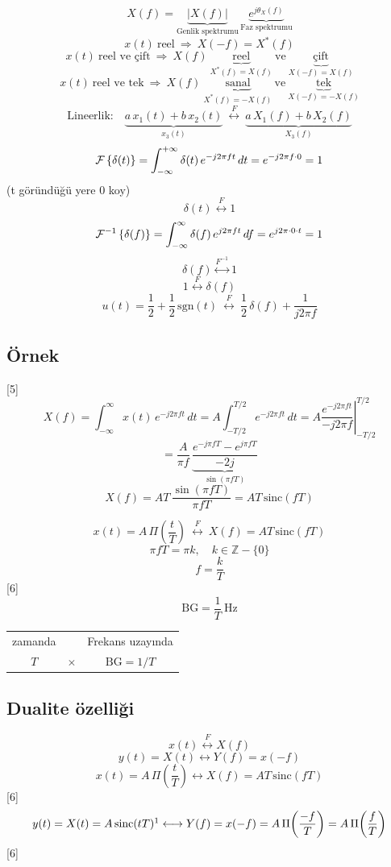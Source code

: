 \documentclass[11pt,a4paper]{article}
\begin{document}
\[ X(f)=\underbrace{|X(f)|}_{\text{Genlik spektrumu}}\,\underbrace{e^{j\theta_X(f)}}_{\text{Faz spektrumu}} \]
\[ x(t)\ \text{reel}\ \Rightarrow\ X(-f)=X^{*}(f) \]
\[ x(t)\ \text{reel ve çift}\ \Rightarrow\ X(f)\ \underbrace{\text{reel}}_{X^{*}(f)=X(f)}\ \text{ve}\ \underbrace{\text{çift}}_{X(-f)=X(f)} \]
\[ x(t)\ \text{reel ve tek}\ \Rightarrow\ X(f)\ \underbrace{\text{sanal}}_{X^{*}(f)=-X(f)}\ \text{ve}\ \underbrace{\text{tek}}_{X(-f)=-X(f)} \]
\[ \text{Lineerlik:}\quad \underbrace{a\,x_1(t)+b\,x_2(t)}_{x_3(t)}\ \overset{F}{\longleftrightarrow}\ \underbrace{a\,X_1(f)+b\,X_2(f)}_{X_3(f)} \]
\[ \mathcal{F}\left\{\delta(t)\right\}=\int_{-\infty}^{+\infty}\delta(t)\,e^{-j2\pi ft}\,dt=e^{-j2\pi f\cdot 0}=1 \]
{\small\textcolor{turuncukalem}{(t göründüğü yere 0 koy)}}
\[ \delta(t)\overset{F}{\longleftrightarrow}1 \]
\[ \mathcal{F}^{-1}\left\{\delta(f)\right\}=\int_{-\infty}^{\infty}\delta(f)\,e^{j2\pi ft}\,df=e^{j2\pi\cdot 0\cdot t}=1 \]
\[ \delta(f)\overset{F^{-1}}{\longleftrightarrow}1 \]
\[ 1\overset{F}{\longleftrightarrow}\delta(f) \]
\[ u(t)=\frac{1}{2}+\frac{1}{2}\,\mathrm{sgn}(t)\ \overset{F}{\longleftrightarrow}\ \frac{1}{2}\,\delta(f)+\frac{1}{j2\pi f} \]

\subsection{Örnek}
[5]
\[ X(f)=\int_{-\infty}^{\infty}x(t)\,e^{-j2\pi ft}\,dt=A\int_{-T/2}^{T/2}e^{-j2\pi ft}\,dt=A\left.\frac{e^{-j2\pi ft}}{-j2\pi f}\right|_{-T/2}^{T/2} \]
\[ =\frac{A}{\pi f}\,\underbrace{\frac{e^{-j\pi fT}-e^{j\pi fT}}{-2j}}_{\sin(\pi fT)} \]
\[ X(f)=AT\,\frac{\sin(\pi fT)}{\pi fT}=AT\,\mathrm{sinc}(fT) \]

\[ x(t)=A\,\Pi\!\left(\frac{t}{T}\right)\ \overset{F}{\longleftrightarrow}\ X(f)=AT\,\mathrm{sinc}(fT) \]
\[ \pi fT=\pi k,\quad k\in\mathbb{Z}-\{0\} \]
\[ f=\frac{k}{T} \]
[6]
\[ \mathrm{BG}=\frac{1}{T}\ \mathrm{Hz} \]
\begin{center}
\begin{tabular}{ccc}
zamanda & & Frekans uzayında\\
$T$ & $\times$ & $\mathrm{BG}=1/T$
\end{tabular}
\end{center}

\subsection{Dualite özelliği}
\[ x(t)\overset{F}{\longleftrightarrow}X(f) \]
\[ y(t)=X(t)\longleftrightarrow Y(f)=x(-f) \]
\[ x(t)=A\,\Pi\!\left(\frac{t}{T}\right)\longleftrightarrow X(f)=AT\,\mathrm{sinc}(fT) \]
[6]
\[ y(t)=X(t)=A\,\mathrm{sinc}(tT)\footnotemark\longleftrightarrow Y(f)=x(-f)=A\,\Pi\!\left(\frac{-f}{T}\right)=A\,\Pi\!\left(\frac{f}{T}\right) \]
[6]
\end{document}
